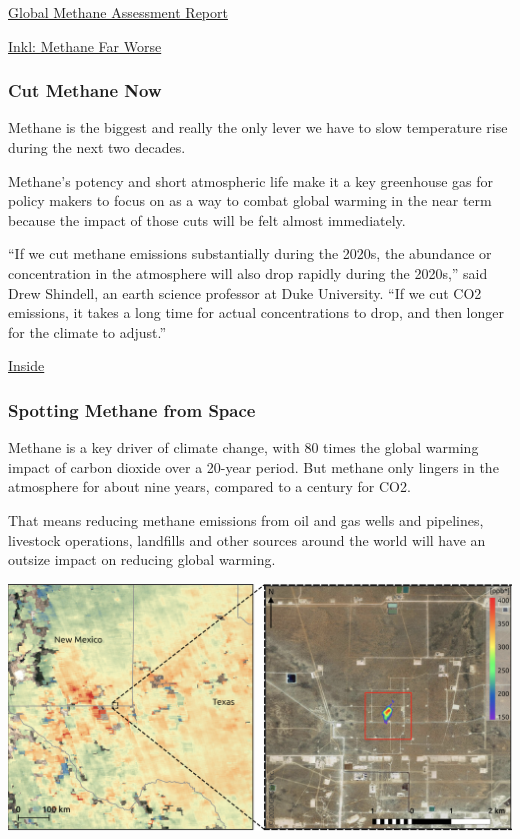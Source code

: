 \documentclass[
]{book}
\begin{document}
\href{https://www.ccacoalition.org/en/resources/global-methane-assessment-full-report}{Global Methane Assessment Report}

\href{https://www.inkl.com/news/a-sweeping-u-n-report-says-methane-is-far-worse-for-the-climate-human-health-than-previously-thought}{Inkl: Methane Far Worse}

\hypertarget{cut-methane-now}{%
\subsubsection{Cut Methane Now}\label{cut-methane-now}}

Methane is the biggest and really the only lever we have to slow
temperature rise during the next two decades.

Methane's potency and short atmospheric life make it a key greenhouse gas for policy makers to focus on as a way to combat global warming in the near term because the impact of those cuts will be felt almost immediately.

``If we cut methane emissions substantially during the 2020s, the abundance or concentration in the atmosphere will also drop rapidly during the 2020s,'' said Drew Shindell, an earth science professor at Duke University. ``If we cut CO2 emissions, it takes a long time for actual concentrations to drop, and then longer for the climate to adjust.''

\href{https://insideclimatenews.org/news/20042021/methane-biden-climate-summit/}{Inside}

\hypertarget{spotting-methane-from-space}{%
\subsubsection{Spotting Methane from Space}\label{spotting-methane-from-space}}

Methane is a key driver of climate change, with 80 times the global warming impact of carbon dioxide over a 20-year period. But methane only lingers in the atmosphere for about nine years, compared to a century for CO2.

That means reducing methane emissions from oil and gas wells and pipelines, livestock operations, landfills and other sources around the world will have an outsize impact on reducing global warming.

\includegraphics{fig/ESA_Methane_Spotting.png}
\end{document}
